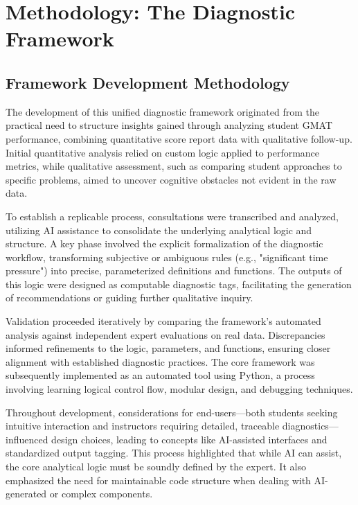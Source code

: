 \documentclass{article}
\begin{document}
\section{Methodology: The Diagnostic Framework}

\subsection{Framework Development Methodology} %

The development of this unified diagnostic framework originated from the practical need to structure insights gained through analyzing student GMAT performance, combining quantitative score report data with qualitative follow-up. Initial quantitative analysis relied on custom logic applied to performance metrics, while qualitative assessment, such as comparing student approaches to specific problems, aimed to uncover cognitive obstacles not evident in the raw data.

To establish a replicable process, consultations were transcribed and analyzed, utilizing AI assistance to consolidate the underlying analytical logic and structure. A key phase involved the explicit formalization of the diagnostic workflow, transforming subjective or ambiguous rules (e.g., "significant time pressure") into precise, parameterized definitions and functions. The outputs of this logic were designed as computable diagnostic tags, facilitating the generation of recommendations or guiding further qualitative inquiry.

Validation proceeded iteratively by comparing the framework's automated analysis against independent expert evaluations on real data. Discrepancies informed refinements to the logic, parameters, and functions, ensuring closer alignment with established diagnostic practices. The core framework was subsequently implemented as an automated tool using Python, a process involving learning logical control flow, modular design, and debugging techniques.

Throughout development, considerations for end-users—both students seeking intuitive interaction and instructors requiring detailed, traceable diagnostics—influenced design choices, leading to concepts like AI-assisted interfaces and standardized output tagging. This process highlighted that while AI can assist, the core analytical logic must be soundly defined by the expert. It also emphasized the need for maintainable code structure when dealing with AI-generated or complex components.
\end{document}

